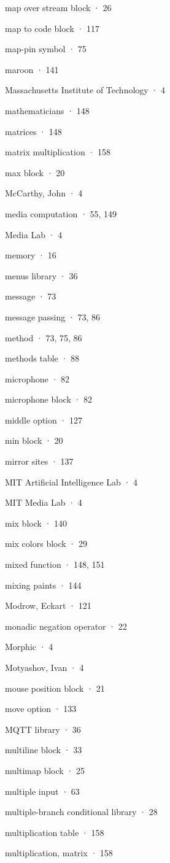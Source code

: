 \documentclass[
  letterpaper,
]{book}
\begin{document}
map over stream block · 26

map to code block · 117

map-pin symbol · 75

maroon · 141

Massachusetts Institute of Technology · 4

mathematicians · 148

matrices · 148

matrix multiplication · 158

max block · 20

McCarthy, John · 4

media computation · 55, 149

Media Lab · 4

memory · 16

menus library · 36

message · 73

message passing · 73, 86

method · 73, 75, 86

methods table · 88

microphone · 82

microphone block · 82

middle option · 127

min block · 20

mirror sites · 137

MIT Artificial Intelligence Lab · 4

MIT Media Lab · 4

mix block · 140

mix colors block · 29

mixed function · 148, 151

mixing paints · 144

Modrow, Eckart · 121

monadic negation operator · 22

Morphic · 4

Motyashov, Ivan · 4

mouse position block · 21

move option · 133

MQTT library · 36

multiline block · 33

multimap block · 25

multiple input · 63

multiple-branch conditional library · 28

multiplication table · 158

multiplication, matrix · 158
\end{document}
